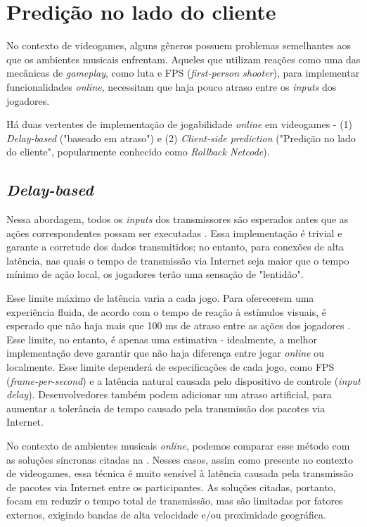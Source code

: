 \section{Predição no lado do cliente}
\label{sec:client_side_prediction}

No contexto de videogames, alguns gêneros possuem problemas semelhantes aos que os ambientes musicais enfrentam. Aqueles que utilizam reações como uma das mecânicas de \textit{gameplay}, como luta e FPS (\textit{first-person shooter}), para implementar funcionalidades \textit{online}, necessitam que haja pouco atraso entre os \textit{inputs} dos jogadores.

Há duas vertentes de implementação de jogabilidade \textit{online} em videogames - (1) \textit{Delay-based} ("baseado em atraso")\cite{rollback} e (2) \textit{Client-side prediction} ("Predição no lado do cliente", popularmente conhecido como \textit{Rollback Netcode})\cite{client-side-prediction}.

\subsection{\textit{Delay-based}}

Nessa abordagem, todos os \textit{inputs} dos transmissores são esperados antes que as ações correspondentes possam ser executadas \cite{rollback}. Essa implementação é trivial e garante a corretude dos dados transmitidos; no entanto, para conexões de alta latência, nas quais o tempo de transmissão via Internet seja maior que o tempo mínimo de ação local, os jogadores terão uma sensação de "lentidão".

Esse limite máximo de latência varia a cada jogo. Para oferecerem uma experiência fluida, de acordo com o tempo de reação à estímulos visuais, é esperado que não haja mais que 100 ms de atraso entre as ações dos jogadores \cite{pubnub}. Esse limite, no entanto, é apenas uma estimativa - idealmente, a melhor implementação deve garantir que não haja diferença entre jogar \textit{online} ou localmente. Esse limite dependerá de especificações de cada jogo, como FPS (\textit{frame-per-second}) e a latência natural causada pelo dispositivo de controle (\textit{input delay}). Desenvolvedores também podem adicionar um atraso artificial, para aumentar a tolerância de tempo causado pela transmissão dos pacotes via Internet.

No contexto de ambientes musicais \textit{online}, podemos comparar esse método com as soluções síncronas citadas na . Nesses casos, assim como presente no contexto de videogames, essa técnica é muito sensível à latência causada pela transmissão de pacotes via Internet entre os participantes. As soluções citadas, portanto, focam em reduzir o tempo total de transmissão, mas são limitadas por fatores externos, exigindo bandas de alta velocidade e/ou proximidade geográfica.

